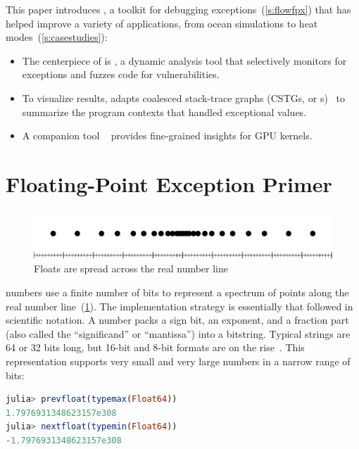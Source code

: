 \documentclass{juliacon}
\begin{document}
This paper introduces \FlowFPX{}, a toolkit for debugging
\fp{} exceptions~(\cref{s:flowfpx})
that has helped improve a variety of applications,
from ocean simulations to heat modes~(\cref{s:casestudies}):
\begin{itemize}
  \item
    The centerpiece of \FlowFPX{} is \FT{}, a dynamic analysis tool that
    selectively monitors for exceptions and fuzzes code for vulnerabilities.
  \item
    To visualize results, \FT{} adapts coalesced stack-trace graphs (CSTGs, or
    \CSTG{}s)~\cite{humphreySystematicDebuggingMethods2014}
    to summarize the program contexts that handled exceptional values.
  \item
    A companion tool \GPUFPX{}~\cite{llsflg-hpdc-2023} provides fine-grained insights for GPU kernels.
\end{itemize}


\section{Floating-Point Exception Primer}
\label{s:background}

\begin{figure}[t]\centering
  \includegraphics[trim=10 0 10 0,clip,width=0.95\columnwidth]{fig/real_vs_fp.pdf}
  \caption{Floats are spread across the real number line}
  \label{f:real-vs-fp}
\end{figure}

\Fp{} numbers use a finite number of bits to represent a spectrum of points along the real number line~(\cref{f:real-vs-fp}).
The implementation strategy is essentially that followed in scientific notation.
A \fp{} number packs a sign bit, an exponent, and a fraction part (also called the ``significand'' or ``mantissa'') into a bitstring.
Typical strings are 64 or 32 bits long, but 16-bit and 8-bit formats are on the rise~\cite{klowerLowprecisionClimateComputing2021,fp8}.
This representation supports very small and very large numbers in a narrow range of bits:

\begin{lstlisting}[language = Julia]
julia> prevfloat(typemax(Float64))
1.7976931348623157e308
julia> nextfloat(typemin(Float64))
-1.7976931348623157e308
\end{lstlisting}
\end{document}
